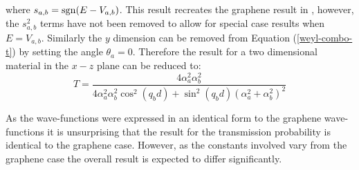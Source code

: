 		where $s_{a,b}=\operatorname{sgn}(E-V_{a,b})$. This result recreates the graphene result in \cite{b1}, however, the $s_{a,b}^{2}$ terms have not been removed to allow for special case results when $E=V_{a,b}$. Similarly the $y$ dimension can be removed from Equation (\ref{weyl-combo-t}) by setting the angle $\theta_{a}=0$. Therefore the result for a two dimensional material in the $x-z$ plane can be reduced to:
		\begin{equation}
			T=\frac{4\alpha_{a}^{2}\alpha_{b}^{2}}{4\alpha_{a}^{2}\alpha_{b}^{2}\cos^{2}(q_{b}d)+\sin^{2}(q_{b}d)\left(\alpha_{a}^{2}+\alpha_{b}^{2}\right)^{2}}
		\end{equation}

		As the wave-functions were expressed in an identical form to the graphene wave-functions it is unsurprising that the result for the transmission probability is identical to the graphene case. However, as the constants involved vary from the graphene case the overall result is expected to differ significantly.
	
